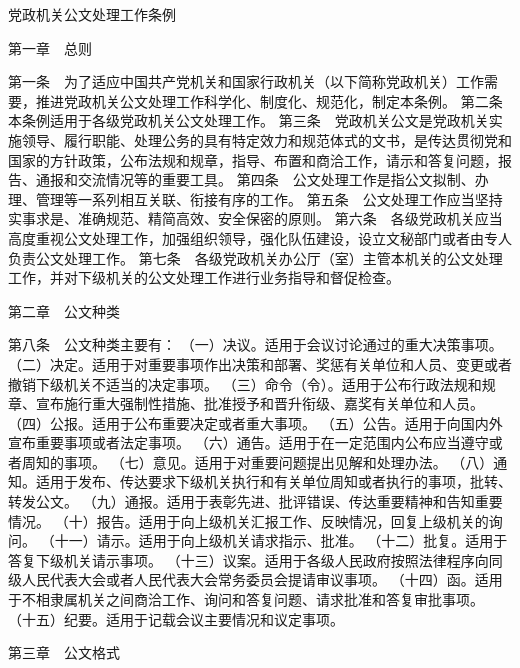 \documentclass{gbt9704}
\begin{document}
党政机关公文处理工作条例

第一章　总则

第一条　为了适应中国共产党机关和国家行政机关（以下简称党政机关）工作需要，推进党政机关公文处理工作科学化、制度化、规范化，制定本条例。
第二条　本条例适用于各级党政机关公文处理工作。
第三条　党政机关公文是党政机关实施领导、履行职能、处理公务的具有特定效力和规范体式的文书，是传达贯彻党和国家的方针政策，公布法规和规章，指导、布置和商洽工作，请示和答复问题，报告、通报和交流情况等的重要工具。
第四条　公文处理工作是指公文拟制、办理、管理等一系列相互关联、衔接有序的工作。
第五条　公文处理工作应当坚持实事求是、准确规范、精简高效、安全保密的原则。
第六条　各级党政机关应当高度重视公文处理工作，加强组织领导，强化队伍建设，设立文秘部门或者由专人负责公文处理工作。
第七条　各级党政机关办公厅（室）主管本机关的公文处理工作，并对下级机关的公文处理工作进行业务指导和督促检查。

第二章　公文种类

第八条　公文种类主要有：
（一）决议。适用于会议讨论通过的重大决策事项。
（二）决定。适用于对重要事项作出决策和部署、奖惩有关单位和人员、变更或者撤销下级机关不适当的决定事项。
（三）命令（令）。适用于公布行政法规和规章、宣布施行重大强制性措施、批准授予和晋升衔级、嘉奖有关单位和人员。
（四）公报。适用于公布重要决定或者重大事项。
（五）公告。适用于向国内外宣布重要事项或者法定事项。
（六）通告。适用于在一定范围内公布应当遵守或者周知的事项。
（七）意见。适用于对重要问题提出见解和处理办法。
（八）通知。适用于发布、传达要求下级机关执行和有关单位周知或者执行的事项，批转、转发公文。
（九）通报。适用于表彰先进、批评错误、传达重要精神和告知重要情况。
（十）报告。适用于向上级机关汇报工作、反映情况，回复上级机关的询问。
（十一）请示。适用于向上级机关请求指示、批准。
（十二）批复。适用于答复下级机关请示事项。
（十三）议案。适用于各级人民政府按照法律程序向同级人民代表大会或者人民代表大会常务委员会提请审议事项。
（十四）函。适用于不相隶属机关之间商洽工作、询问和答复问题、请求批准和答复审批事项。
（十五）纪要。适用于记载会议主要情况和议定事项。

第三章　公文格式
\end{document}
